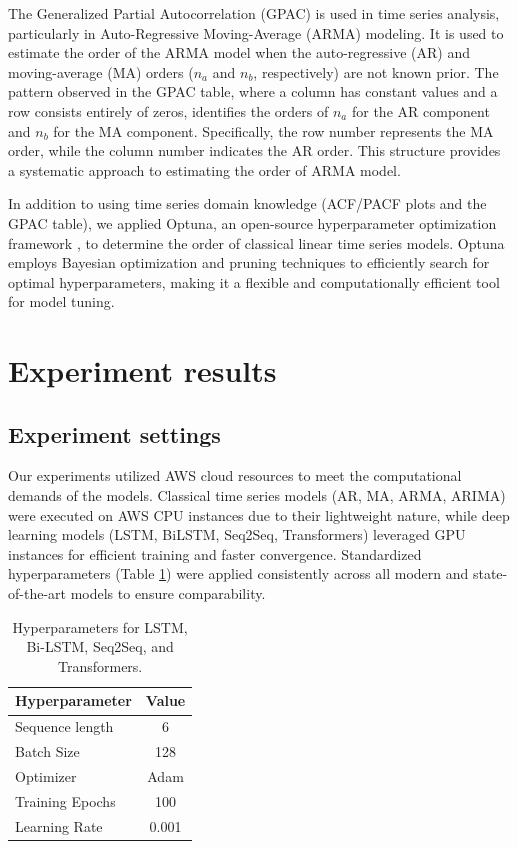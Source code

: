 \documentclass[sn-mathphys-num]{sn-jnl}
\theoremstyle{thmstyleone}%
\theoremstyle{thmstyletwo}%
\theoremstyle{thmstylethree}%
\begin{document}
The Generalized Partial Autocorrelation (GPAC) is used in time series analysis, particularly in Auto-Regressive Moving-Average (ARMA) modeling. It is used to estimate the order of the ARMA model when the auto-regressive (AR) and moving-average (MA) orders (\( n_a \) and \( n_b \), respectively) are not known prior. The pattern observed in the GPAC table, where a column has constant values and a row consists entirely of zeros, identifies the orders of \( n_a \) for the AR component and \( n_b \) for the MA component. Specifically, the row number represents the MA order, while the column number indicates the AR order. This structure provides a systematic approach to estimating the order of ARMA model.


In addition to using time series domain knowledge (ACF/PACF plots and the GPAC table), we applied Optuna, an open-source hyperparameter optimization framework \cite{akiba2019optuna}, to determine the order of classical linear time series models. Optuna employs Bayesian optimization and pruning techniques to efficiently search for optimal hyperparameters, making it a flexible and computationally efficient tool for model tuning.

\section{Experiment results}

\subsection{Experiment settings}
Our experiments utilized AWS cloud resources to meet the computational demands of the models. Classical time series models (AR, MA, ARMA, ARIMA) were executed on AWS CPU instances due to their lightweight nature, while deep learning models (LSTM, BiLSTM, Seq2Seq, Transformers) leveraged GPU instances for efficient training and faster convergence. Standardized hyperparameters (Table \ref{tab:hyperparams}) were applied consistently across all modern and state-of-the-art models to ensure comparability.
\setlength{\tabcolsep}{0.2pt} 
\begin{table}[]
\centering
\begin{tabular}{lc}
\hline
\textbf{Hyperparameter} & \hspace{3cm} \textbf{Value} \\ \hline
Sequence length         & \hspace{3cm} 6           \\ 
Batch Size              & \hspace{3cm} 128           \\ 
Optimizer               & \hspace{3cm} Adam          \\ 
Training Epochs         & \hspace{3cm} 100           \\ 
Learning Rate           & \hspace{3cm} 0.001         \\ \hline
\end{tabular}
\caption{Hyperparameters for LSTM, Bi-LSTM, Seq2Seq, and Transformers.}
\label{tab:hyperparams}
\end{table}
\end{document}
